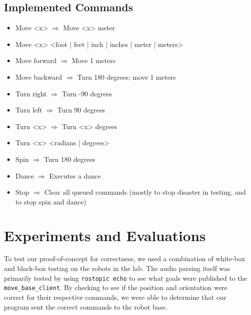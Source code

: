 \documentclass{article}
\begin{document}
\subsection{Implemented Commands}
\begin{itemize}
    \item Move <x> $\Rightarrow$  Move <x> meter
    \item Move <x> <foot | feet | inch | inches | meter | meters>
    \item Move forward $\Rightarrow$ Move 1 meters
    \item Move backward $\Rightarrow$ Turn 180 degrees; move 1 meters
    \item Turn right $\Rightarrow$ Turn -90 degrees
    \item Turn left $\Rightarrow$ Turn 90 degrees
    \item Turn <x> $\Rightarrow$ Turn <x> degrees
    \item Turn <x> <radians | degrees>
    \item Spin $\Rightarrow$ Turn 180 degrees
    \item Dance $\Rightarrow$ Executes a dance
    \item Stop $\Rightarrow$ Clear all queued commands (mostly to stop disaster in testing, and to stop spin and dance)
\end{itemize}
 

\section{Experiments and Evaluations}
To test our proof-of-concept for correctness, we used a combination of white-box and black-box testing on the robots in the lab. The audio parsing itself was primarily tested by using \texttt{rostopic echo} to see what goals were published to the \texttt{move\_base\_client}. By checking to see if the position and orientation were correct for their respective commands, we were able to determine that our program sent the correct commands to the robot base.\par

\vspace{5mm}
\end{document}
